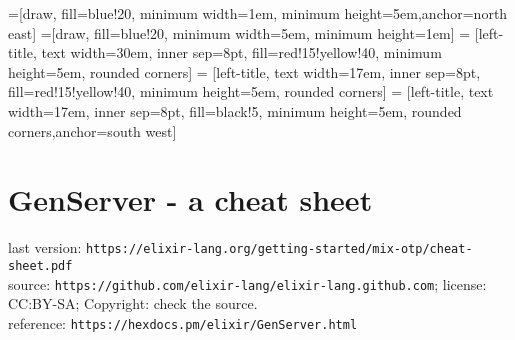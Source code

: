 \documentclass[a4paper]{article}
\def\parchmentframe#1{
\tikz{
  \node[inner sep=2em] (A) {#1};  %
  \begin{pgfonlayer}{background}  %
  \filldraw[normal border,rounded corners=2em,color=blue!10!yellow!5,draw=blue!25!yellow,dashed]
        (A.south east) -- (A.south west) --
        (A.north west) -- (A.north east) -- cycle;
  \end{pgfonlayer}}}
\def\parchmentframetop#1{
\tikz{
  \node[inner sep=2em] (A) {#1};    %
  \begin{pgfonlayer}{background}
  \filldraw[normal border,rounded corners,color=blue!10!yellow!5,draw=blue!25!yellow,dashed]
        (A.south east) -- (A.south west) --
        (A.north west) -- (A.north east) -- cycle;
  \end{pgfonlayer}}}
\def\parchmentframebottom#1{
\tikz{
  \node[inner sep=2em] (A) {#1};   %
  \begin{pgfonlayer}{background}
  \filldraw[normal border,rounded corners,color=blue!10!yellow!5,draw=blue!25!yellow,dashed]
        (A.south east) -- (A.south west) --
        (A.north west) -- (A.north east) -- cycle;
  \end{pgfonlayer}}}
\def\parchmentframemiddle#1{
\tikz{
  \node[inner sep=2em] (A) {#1};   %
  \begin{pgfonlayer}{background}
  \filldraw[normal border,rounded corners,color=blue!10!yellow!5,draw=blue!25!yellow,dashed]
        (A.south east) -- (A.south west) --
        (A.north west) -- (A.north east) -- cycle;
  \end{pgfonlayer}}}
\newenvironment{parchment}[1][Example]{%
  \def\FrameCommand{\parchmentframe}%
  \def\FirstFrameCommand{\parchmentframetop}%
  \def\LastFrameCommand{\parchmentframebottom}%
  \def\MidFrameCommand{\parchmentframemiddle}%
  \vskip\baselineskip
  \MakeFramed {\FrameRestore}
  \noindent\tikz\node[rounded corners=2ex, inner sep=2ex, draw=blue!25!yellow, fill=white, dashed, anchor=west, overlay] at (0em, 2em) {\sffamily#1};\par}%
{\endMakeFramed}
\begin{document}

=[draw, fill=blue!20, minimum width=1em, minimum height=5em,anchor=north east]
=[draw, fill=blue!20, minimum width=5em, minimum height=1em]
 = [left-title, text width=30em, inner sep=8pt, fill=red!15!yellow!40, minimum height=5em, rounded corners]
 = [left-title, text width=17em, inner sep=8pt, fill=red!15!yellow!40, minimum height=5em, rounded corners]
 = [left-title, text width=17em, inner sep=8pt, fill=black!5, minimum height=5em, rounded corners,anchor=south west]

\begin{comment}
\begin{parchment}[commentarii de bello gallico]
  Gallia est omnis divisa in partes tres, quarum unam incolunt Belgae, aliam Aquitani, tertiam qui ipsorum lingua Celtae, nostra Galli appellantur. Hi omnes lingua, institutis, legibus inter se differunt. Gallos ab Aquitanis Garumna flumen, a Belgis Matrona et Sequana dividit. Horum omnium fortissimi sunt Belgae, propterea quod a cultu atque humanitate provinciae longissime absunt, minimeque ad eos mercatores saepe commeant atque ea quae ad effeminandos animos pertinent important, proximique sunt Germanis, qui trans Rhenum incolunt, quibuscum continenter bellum gerunt. Qua de causa Helvetii quoque reliquos Gallos virtute praecedunt, quod fere cotidianis proeliis cum Germanis contendunt, cum aut suis finibus eos prohibent aut ipsi in eorum finibus bellum gerunt. Eorum una pars, quam Gallos obtinere dictum est, initium capit a flumine Rhodano, continetur Garumna flumine, Oceano, finibus Belgarum, attingit etiam ab Sequanis et Helvetiis flumen Rhenum, vergit ad septentriones. Belgae ab extremis Galliae finibus oriuntur, pertinent ad inferiorem partem fluminis Rheni, spectant in septentrionem et orientem solem. Aquitania a Garumna flumine ad Pyrenaeos montes et eam partem Oceani quae est ad Hispaniam pertinet; spectat inter occasum solis et septentriones.
\end{parchment}
\end{comment}
\section*{GenServer - a cheat sheet}
last version: \verb|https://elixir-lang.org/getting-started/mix-otp/cheat-sheet.pdf|\\
source: \verb|https://github.com/elixir-lang/elixir-lang.github.com|; license: CC:BY-SA; Copyright: check the source.\\
reference: \verb|https://hexdocs.pm/elixir/GenServer.html|
\begin{comment}
  copyright 2019 by Mario Frasca et al.

  based on a work by Benjamin Tan Wei Hao,
  rewritten as a tex/tikz document by Mario Frasca,
  with José Valim validating the content.

  TODO: add yourself to the authors if you think so.
\end{comment}
\end{document}
